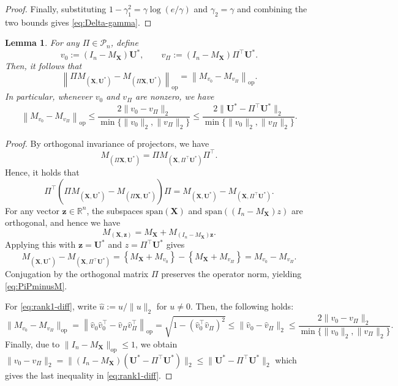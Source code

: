 \documentclass[11pt, reqno]{amsart}
\newcommand{\R}{\mathbb{R}}
\renewcommand{\hat}{\widehat}
\renewcommand{\le}{\leqslant}
\newcommand{\mP}{\mathcal{P}}
\newcommand{\1}{\mbox{1}\hspace{-0.25em}\mbox{l}}
\theoremstyle{definition}\newtheorem{problem}{Problem}[section]
\theoremstyle{definition}\newtheorem{definition}[problem]{Definition}
\theoremstyle{remark}\newtheorem{assumption}{Assumption}
\theoremstyle{remark}\newtheorem{remark}[problem]{Remark}
\theoremstyle{definition}\newtheorem{example}[problem]{Example}
\theoremstyle{plain}\newtheorem{theorem}[problem]{Theorem}
\theoremstyle{plain}\newtheorem{question}[problem]{Question}
\theoremstyle{plain}\newtheorem{lemma}[problem]{Lemma}
\theoremstyle{plain}\newtheorem{proposition}[problem]{Proposition}
\theoremstyle{plain}\newtheorem{corollary}[problem]{Corollary}
\theoremstyle{plain}\newtheorem{conjecture}[problem]{Conjecture}
\begin{document}
\begin{proof}
Finally, substituting $1-\gamma_1^2=\gamma\log(e/\gamma)$ and $\gamma_2=\gamma$
and combining the two bounds gives \eqref{eq:Delta-gamma}.
\end{proof}



\begin{lemma}\label{lem:proj-diff}
For any $\Pi\in\mP_n$, define
\[
v_0:=(I_n-M_{\bm X})\bm U^*,
\qquad
v_\Pi:=(I_n-M_{\bm X})\Pi^\top \bm U^* .
\]
Then, it follows that
\begin{equation}
\left\|\Pi M_{(\bm X,\bm U^*)} - M_{(\Pi \bm X,\bm U^*)}\right\|_{\mathrm{op}}
=
\left\|M_{v_0}-M_{v_\Pi}\right\|_{\mathrm{op}} .
\label{eq:PiPminusM}
\end{equation}
In particular, whenever $v_0$ and $v_\Pi$ are nonzero, we have
\begin{equation}
\left\|M_{v_0}-M_{v_\Pi}\right\|_{\mathrm{op}}
\le
\frac{2\|v_0-v_\Pi\|_2}{\min\{\|v_0\|_2,\|v_\Pi\|_2\}}
\le
\frac{2\|\bm U^*-\Pi^\top \bm U^*\|_2}{\min\{\|v_0\|_2,\|v_\Pi\|_2\}} .
\label{eq:rank1-diff}
\end{equation}
\end{lemma}

\begin{proof}
By orthogonal invariance of projectors, we have
\[
M_{(\Pi \bm X,\bm U^*)}=\Pi M_{(\bm X,\Pi^\top \bm U^*)}\Pi^\top.
\]
Hence, it holds that
\[
\Pi^\top\left(\Pi M_{(\bm X,\bm U^*)}-M_{(\Pi \bm X,\bm U^*)}\right)\Pi
= M_{(\bm X,\bm U^*)}-M_{(\bm X,\Pi^\top \bm U^*)}.
\]
For any vector $\bm{z} \in \R^n$, the subspaces $\mathrm{span}(\bm X)$ and $\mathrm{span}\left((I_n-M_{\bm X})z\right)$ are orthogonal, and hence we have
\[
M_{(\bm X,\bm{z})} = M_{\bm X} + M_{(I_n-M_{\bm X})\bm{z}}.
\]
Applying this with $\bm{z}=\bm U^*$ and $z=\Pi^\top \bm U^*$ gives
\[
M_{(\bm X,\bm U^*)}-M_{(\bm X,\Pi^\top \bm U^*)}
= \left\{M_{\bm X}+M_{v_0}\right\}-\left\{M_{\bm X}+M_{v_\Pi}\right\}
= M_{v_0}-M_{v_\Pi}.
\]
Conjugation by the orthogonal matrix $\Pi$ preserves the operator norm, yielding \eqref{eq:PiPminusM}.

For \eqref{eq:rank1-diff}, write $\hat u:=u/\|u\|_2$ for $u\neq 0$. Then, the following holds:
\[
\|M_{v_0}-M_{v_\Pi}\|_{\mathrm{op}}
=\left\|\hat v_0\hat v_0^\top-\hat v_\Pi\hat v_\Pi^\top\right\|_{\mathrm{op}}
=\sqrt{1-(\hat v_0^\top \hat v_\Pi)^2}
\le \|\hat v_0-\hat v_\Pi\|_2
\le \frac{2\|v_0-v_\Pi\|_2}{\min\{\|v_0\|_2,\|v_\Pi\|_2\}}.
\]
Finally, due to $\|I_n-M_{\bm X}\|_{\mathrm{op}}\le 1$, we obtain $
\|v_0-v_\Pi\|_2
=\|(I_n-M_{\bm X})(\bm U^*-\Pi^\top \bm U^*)\|_2
\le \|\bm U^*-\Pi^\top \bm U^*\|_2$
which gives the last inequality in \eqref{eq:rank1-diff}.
\end{proof}
\end{document}
